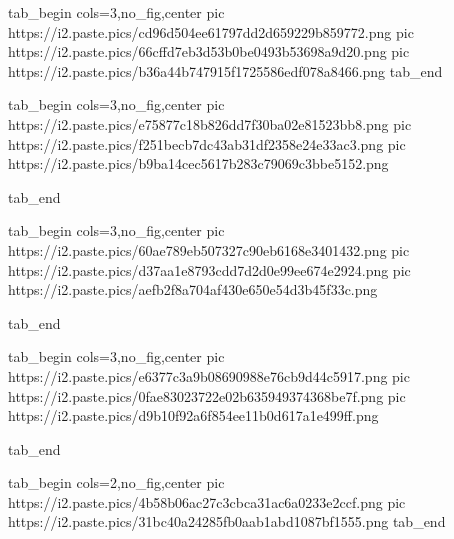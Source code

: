  
 
 
 
 
\zzSecCmtScr


\ifcmt
  tab_begin cols=3,no_fig,center
     pic https://i2.paste.pics/cd96d504ee61797dd2d659229b859772.png
		 pic https://i2.paste.pics/66cffd7eb3d53b0be0493b53698a9d20.png
		 pic https://i2.paste.pics/b36a44b747915f1725586edf078a8466.png
  tab_end
\fi

\ifcmt
  tab_begin cols=3,no_fig,center
	pic https://i2.paste.pics/e75877c18b826dd7f30ba02e81523bb8.png
	pic https://i2.paste.pics/f251becb7dc43ab31df2358e24e33ac3.png
	pic https://i2.paste.pics/b9ba14cec5617b283c79069c3bbe5152.png

  tab_end
\fi

\ifcmt
  tab_begin cols=3,no_fig,center
	pic https://i2.paste.pics/60ae789eb507327c90eb6168e3401432.png
	pic https://i2.paste.pics/d37aa1e8793cdd7d2d0e99ee674e2924.png
	pic https://i2.paste.pics/aefb2f8a704af430e650e54d3b45f33c.png

  tab_end
\fi

\ifcmt
  tab_begin cols=3,no_fig,center
	pic https://i2.paste.pics/e6377c3a9b08690988e76cb9d44c5917.png
	pic https://i2.paste.pics/0fae83023722e02b635949374368be7f.png
	pic https://i2.paste.pics/d9b10f92a6f854ee11b0d617a1e499ff.png

  tab_end
\fi

\ifcmt
  tab_begin cols=2,no_fig,center
	pic https://i2.paste.pics/4b58b06ac27c3cbca31ac6a0233e2ccf.png
	pic https://i2.paste.pics/31bc40a24285fb0aab1abd1087bf1555.png
  tab_end
\fi
